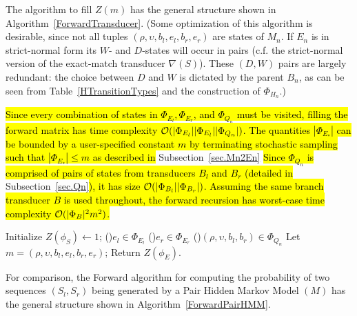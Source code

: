 \documentclass{article}
\newcommand{\secref}[1]{Subsection~\ref{sec.#1}}
\newcommand\recognize{\nabla}
\newcommand\States{\Phi}
\newcommand\statesof[1]{\States_{#1}}
\newcommand\startstate{\phi_S}
\newcommand\laststate{\phi_E}
\newcommand\laststateof[1]{\phi_{E;#1}}
\newcommand\numberofstates[1]{|\statesof{#1}|}
\newcommand\mstate{(\rho,\upsilon,b_l,e_l,b_r,e_r)}
\newcommand\qstate{(\rho,\upsilon,b_l,b_r)}
\begin{document}
The algorithm to fill $Z(m)$ has the general structure shown in Algorithm~\ref{ForwardTransducer}.
(Some optimization of this algorithm is desirable, since not all tuples $\mstate$ are states of $M_n$.
If $E_n$ is in strict-normal form its $W$- and $D$-states will occur in pairs
(c.f. the strict-normal version of the exact-match transducer $\recognize(S)$).
These $(D,W)$ pairs are largely redundant: the choice between $D$ and $W$ is dictated by the parent $B_n$,
as can be seen from Table~\ref{HTransitionTypes} and the construction of $\statesof{H_n}$.)

\hl{
Since every combination of states in 
$\statesof{E_l}, \statesof{E_r}$, and $\statesof{Q_n}$ must be visited, filling the forward
matrix has time complexity ${\cal O}(\numberofstates{E_l} \numberofstates{E_l} \numberofstates{Q_n})$.  
The quantities $\numberofstates{E_*}$ can be bounded by a user-specified constant $m$  
by terminating  stochastic sampling such that $\numberofstates{E_*} \leq m$ 
as described in} \secref{Mn2En} 
\hl{
Since $\statesof{Q_n}$ is comprised of pairs of states from transducers $B_l$ and $B_r$ (detailed in 
}\secref{Qn}\hl{), it has size
${\cal O}( \numberofstates{B_l} \numberofstates{B_r})$.  
Assuming the same branch transducer $B$ is used throughout, 
the forward recursion has worst-case time complexity ${\cal O}(\numberofstates{B}^2m^2)$.}

\begin{algorithm}
  Initialize $Z(\startstate) \leftarrow 1$;
  \BlankLine
  \ForEach(){$e_l \in \statesof{E_l}$} {
    \ForEach(){$e_r \in \statesof{E_r}$} {
      \ForEach(){$\qstate \in \statesof{Q_n}$} {
        Let $m = \mstate$;
        \BlankLine
        \If{$m \in \statesof{M_n}$}{
          Compute $Z(m)$;
        }
      }
    }
  }
  Return $Z(\laststate)$.
\caption{\label{ForwardTransducer}
The analog of the Forward algorithm for transducer $M_n$, described in \secref{Mn}. This is used during progressive reconstruction to store the sum-over-paths likelihood up to each state in $\statesof{M_n}$.  The value of $Z(\laststateof)$ is the likelihood of sequences descended from node $n$. 
}
\end{algorithm}

For comparison, the Forward algorithm for computing the probability of two sequences $(S_l,S_r)$
being generated by a Pair Hidden Markov Model $(M)$ has the general structure shown in Algorithm~\ref{ForwardPairHMM}.
\end{document}
